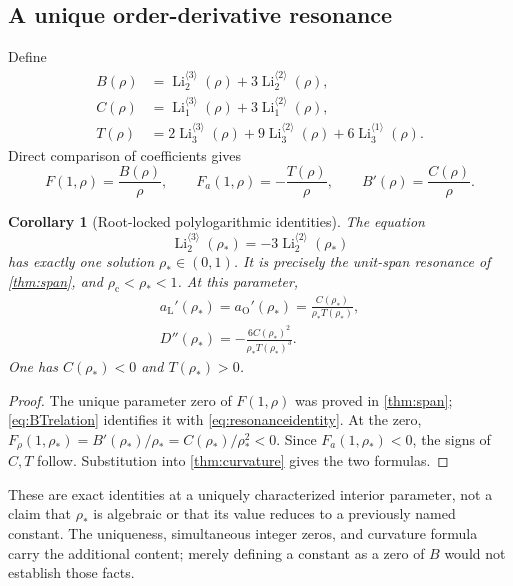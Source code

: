 \documentclass[11pt]{article}
\numberwithin{equation}{section}
\newtheorem{corollary}[corollary]{Corollary}
\theoremstyle{definition}
\newcommand{\Li}{\operatorname{Li}}
\newcommand{\lc}{\rho_{\mathrm c}}
\newcommand{\rs}{\rho_*}
\newcommand{\aL}{a_{\mathrm L}}
\newcommand{\aO}{a_{\mathrm O}}
\newcommand{\ordli}[2]{\Li_{#1}^{\langle #2\rangle}}
\begin{document}
\subsection{A unique order-derivative resonance}
Define
\begin{align}
 B(\rho)&=\ordli{2}{3}(\rho)+3\ordli{2}{2}(\rho),\label{eq:B}\\
 C(\rho)&=\ordli{1}{3}(\rho)+3\ordli{1}{2}(\rho),\label{eq:C}\\
 T(\rho)&=2\ordli{3}{3}(\rho)+9\ordli{3}{2}(\rho)
                                      +6\ordli{3}{1}(\rho).\label{eq:T}
\end{align}
Direct comparison of coefficients gives
\begin{equation}\label{eq:BTrelation}
 F(1,\rho)=\frac{B(\rho)}\rho,\qquad
 F_a(1,\rho)=-\frac{T(\rho)}\rho,\qquad
 B'(\rho)=\frac{C(\rho)}\rho.
\end{equation}

\begin{corollary}[Root-locked polylogarithmic identities]\label{cor:polyidentities}
The equation
\begin{equation}\label{eq:resonanceidentity}
 \boxed{\ordli{2}{3}(\rs)=-3\ordli{2}{2}(\rs)}
\end{equation}
has exactly one solution $\rs\in(0,1)$. It is precisely the unit-span
resonance of \cref{thm:span}, and $\lc<\rs<1$.
At this parameter,
\begin{align}
 \boxed{\aL'(\rs)=\aO'(\rs)=\frac{C(\rs)}{\rs T(\rs)}} ,
 \label{eq:polyvelocity}\\
 \boxed{D''(\rs)=-\frac{6C(\rs)^2}{\rs T(\rs)^3}} .
 \label{eq:polycurvature}
\end{align}
One has $C(\rs)<0$ and $T(\rs)>0$.
\end{corollary}
\begin{proof}
The unique parameter zero of $F(1,\rho)$ was proved in \cref{thm:span};
\eqref{eq:BTrelation} identifies it with \eqref{eq:resonanceidentity}.
At the zero, $F_\rho(1,\rs)=B'(\rs)/\rs=C(\rs)/\rs^2<0$.
Since $F_a(1,\rs)<0$, the signs of $C,T$ follow.
Substitution into \cref{thm:curvature} gives the two formulas.
\end{proof}

These are exact identities at a uniquely characterized interior parameter,
not a claim that $\rs$ is algebraic or that its value reduces to a previously
named constant. The uniqueness, simultaneous integer zeros, and curvature
formula carry the additional content; merely defining a constant as a zero
of $B$ would not establish those facts.
\end{document}
